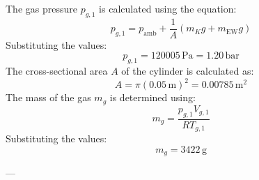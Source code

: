 The gas pressure \( p_{g,1} \) is calculated using the equation:  
\[
p_{g,1} = p_{\text{amb}} + \frac{1}{A}(m_K g + m_{\text{EW}} g)
\]  
Substituting the values:  
\[
p_{g,1} = 120005 \, \text{Pa} = 1.20 \, \text{bar}
\]  
The cross-sectional area \( A \) of the cylinder is calculated as:  
\[
A = \pi (0.05 \, \text{m})^2 = 0.00785 \, \text{m}^2
\]  
The mass of the gas \( m_g \) is determined using:  
\[
m_g = \frac{p_{g,1} V_{g,1}}{R T_{g,1}}
\]  
Substituting the values:  
\[
m_g = 3422 \, \text{g}
\]  

---